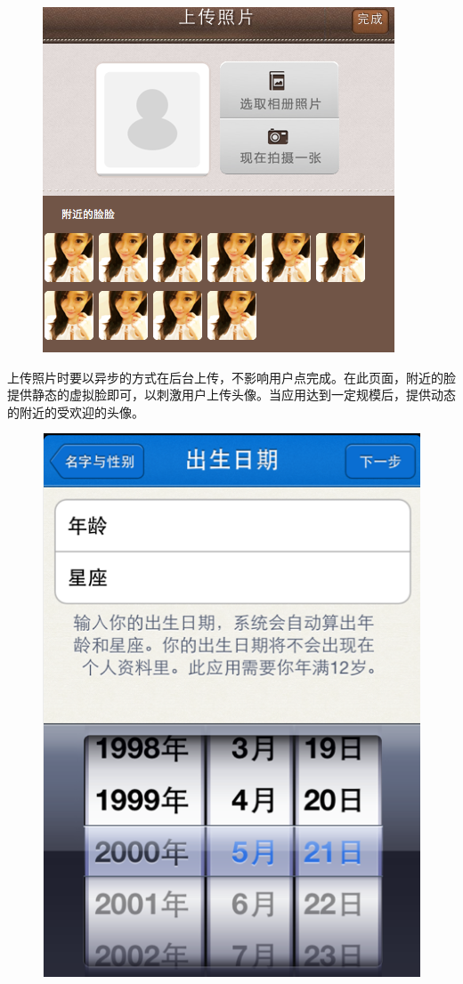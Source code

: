 \documentclass[cs4size]{ctexartutf8}
\begin{document}
\begin{figure}[H]
\centering
\includegraphics[scale=0.5]{./2.png}
\end{figure}

上传照片时要以异步的方式在后台上传，不影响用户点完成。在此页面，附近的脸提供静态的虚拟脸即可，以刺激用户上传头像。当应用达到一定规模后，提供动态的附近的受欢迎的头像。

\begin{figure}[H]
\centering
\includegraphics[scale=0.3]{./age.png}
\end{figure}
\end{document}
